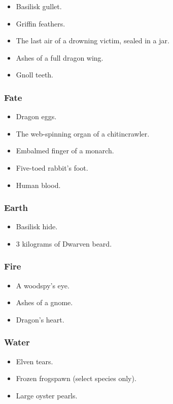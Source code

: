 \begin{multicols}{2}
\begin{itemize}
  \item
  Basilisk gullet.
  \item
  Griffin feathers.
  \item
  The last air of a drowning victim, sealed in a jar.
  \item
  Ashes of a full dragon wing.
  \item
  Gnoll teeth.
\end{itemize}

\subsubsection{Fate}

\begin{itemize}
  \item
  Dragon eggs.
  \item
  The web-spinning organ of a chitincrawler.
  \item
  Embalmed finger of a monarch.
  \item
  Five-toed rabbit's foot.
  \item
  Human blood.
\end{itemize}

\subsubsection{Earth}

\begin{itemize}
  \item
  Basilisk hide.
  \item
  3 kilograms of Dwarven beard.
\end{itemize}

\subsubsection{Fire}

\begin{itemize}
  \item
  A woodspy's eye.
  \item
  Ashes of a gnome.
  \item
  Dragon's heart.
\end{itemize}

\subsubsection{Water}

\begin{itemize}
  \item
  Elven tears.
  \item
  Frozen frogspawn (select species only).
  \item
  Large oyster pearls.
\end{itemize}

\end{multicols}

